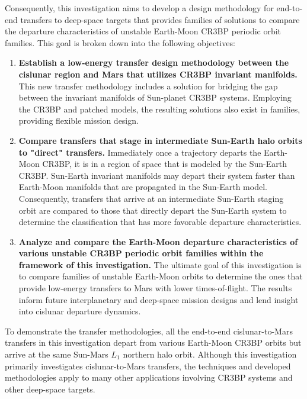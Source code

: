 Consequently, this investigation aims to develop a design methodology for end-to-end transfers to
deep-space targets that provides families of solutions to compare the departure characteristics of
unstable Earth-Moon CR3BP periodic orbit families. This goal is broken down into the following
objectives:
\begin{enumerate}
    \item   \textbf{Establish a low-energy transfer design methodology between the cislunar region
			and Mars that utilizes CR3BP invariant manifolds.} This new transfer methodology
			includes a solution for bridging the gap between the invariant manifolds of Sun-planet
			CR3BP systems. Employing the CR3BP and patched models, the resulting solutions also
			exist in families, providing flexible mission design.
    \item   \textbf{Compare transfers that stage in intermediate Sun-Earth halo orbits to "direct"
			transfers.} Immediately once a trajectory departs the Earth-Moon CR3BP, it is in a
			region of space that is modeled by the Sun-Earth CR3BP. Sun-Earth invariant manifolds
			may depart their system faster than Earth-Moon manifolds that are propagated in the
			Sun-Earth model. Consequently, transfers that arrive at an intermediate Sun-Earth
			staging orbit are compared to those that directly depart the Sun-Earth system to
			determine the classification that has more favorable departure characteristics.
\newpage
    \item   \textbf{Analyze and compare the Earth-Moon departure characteristics of various
			unstable CR3BP periodic orbit families within the framework of this investigation.} The
			ultimate goal of this investigation is to compare families of unstable Earth-Moon
			orbits to determine the ones that provide low-energy transfers to Mars with lower
			times-of-flight. The results inform future interplanetary and deep-space mission
			designs and lend insight into cislunar departure dynamics.

\end{enumerate}
To demonstrate the transfer methodologies, all the end-to-end cislunar-to-Mars transfers in this
investigation depart from various Earth-Moon CR3BP orbits but arrive at the same Sun-Mars $L_{1}$
northern halo orbit. Although this investigation primarily investigates cislunar-to-Mars transfers,
the techniques and developed methodologies apply to many other applications involving CR3BP systems
and other deep-space targets.

